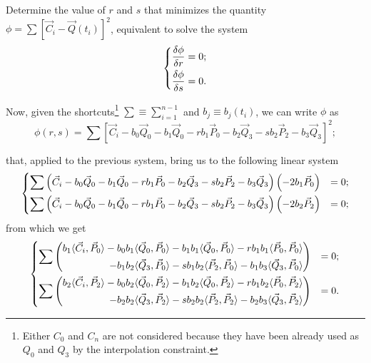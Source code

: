 \documentclass{scrartcl}
\newcommand\V[1]{\vec{#1}}
\newcommand\SP[2]{\langle #1, #2 \rangle}
\begin{document}
Determine the value of $r$ and $s$ that minimizes the quantity
$\phi = \sum \left[ \V{C}_i - \V{Q}(t_i) \right]^2$, equivalent to
solve the system
\begin{equation*}
\begin{dcases}
\frac{\delta\phi}{\delta r} = 0;\\
\frac{\delta\phi}{\delta s} = 0.
\end{dcases}
\end{equation*}

Now, given the shortcuts\footnote{Either $C_0$ and $C_n$ are not
considered because they have been already used as $Q_0$ and $Q_3$ by the
interpolation constraint.} $\sum \equiv \sum_{i=1}^{n-1}$ and
$b_j \equiv b_j(t_i)$, we can write $\phi$ as
\begin{equation*}
    \phi(r, s) = \sum \left[ \V{C}_i - b_0 \V{Q}_0 - b_1 \V{Q}_0 -
    r b_1 \V{P}_0 - b_2 \V{Q}_3 - s b_2 \V{P}_2 - b_3 \V{Q}_3 \right]^2;
\end{equation*}

that, applied to the previous system, bring us to the following linear system
\begin{equation*}
\begin{dcases}
    \sum \left(
	\V{C}_i - b_0 \V{Q}_0 - b_1 \V{Q}_0 - r b_1 \V{P}_0 -
	b_2 \V{Q}_3 - s b_2 \V{P}_2 - b_3 \V{Q}_3
    \right) \left( -2 b_1 \V{P}_0 \right) &= 0; \\
    \sum \left(
	\V{C}_i - b_0 \V{Q}_0 - b_1 \V{Q}_0 - r b_1 \V{P}_0 -
	b_2 \V{Q}_3 - s b_2 \V{P}_2 - b_3 \V{Q}_3
    \right) \left( -2 b_2 \V{P}_2 \right) &= 0; \\
\end{dcases}
\end{equation*}
from which we get
\begin{equation*}
\begin{dcases}
    \sum \left(
    \begin{split}
	b_1       \SP{\V{C}_i}{\V{P}_0} -
	b_0 b_1   \SP{\V{Q}_0}{\V{P}_0} -
	b_1 b_1   \SP{\V{Q}_0}{\V{P}_0} -
	r b_1 b_1 \SP{\V{P}_0}{\V{P}_0} \\ -
	b_1 b_2   \SP{\V{Q}_3}{\V{P}_0} -
	s b_1 b_2 \SP{\V{P}_2}{\V{P}_0} -
	b_1 b_3   \SP{\V{Q}_3}{\V{P}_0}
    \end{split}
    \right) &= 0; \\
    \sum \left(
    \begin{split}
	b_2       \SP{\V{C}_i}{\V{P}_2} -
	b_0 b_2   \SP{\V{Q}_0}{\V{P}_2} -
	b_1 b_2   \SP{\V{Q}_0}{\V{P}_2} -
	r b_1 b_2 \SP{\V{P}_0}{\V{P}_2} \\ -
	b_2 b_2   \SP{\V{Q}_3}{\V{P}_2} -
	s b_2 b_2 \SP{\V{P}_2}{\V{P}_2} -
	b_2 b_3   \SP{\V{Q}_3}{\V{P}_2}
    \end{split}
    \right) &= 0. \\
\end{dcases}
\end{equation*}
\end{document}
